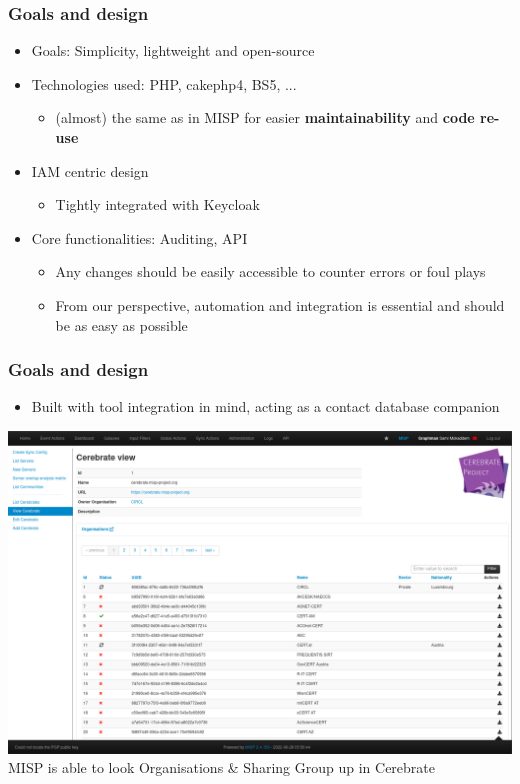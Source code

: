 \begin{frame}
\frametitle{Goals and design}
    \begin{itemize}
        \item Goals: Simplicity, lightweight and open-source
        \item Technologies used: PHP, cakephp4, BS5, ...
            \begin{itemize}
                \item (almost) the same as in MISP for easier \textbf{maintainability} and \textbf{code re-use}
            \end{itemize}
        \item IAM centric design
            \begin{itemize}
                \item Tightly integrated with Keycloak
            \end{itemize}
        \item Core functionalities: Auditing, API
            \begin{itemize}
                \item Any changes should be easily accessible to counter errors or foul plays
                \item From our perspective, automation and integration is essential and should be as easy as possible
            \end{itemize}
    \end{itemize}
\end{frame}

\begin{frame}
\frametitle{Goals and design}
    \begin{itemize}
        \item Built with tool integration in mind, acting as a contact database companion
    \end{itemize}
    \begin{center}
        \includegraphics[width=0.85\linewidth]{pictures/misp-cerebrate.png}\\

        MISP is able to look Organisations \& Sharing Group up in Cerebrate
    \end{center}
\end{frame}

